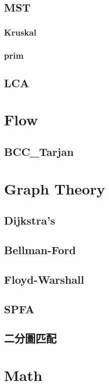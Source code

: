 	\subsection{MST}
        \subsubsection{Kruskal}
            
        \subsubsection{prim}
            
	\subsection{LCA}
		
\section{Flow}
	\subsection{BCC\_Tarjan}
		
\section{Graph Theory}
	\subsection{Dijkstra’s}
		
	\subsection{Bellman-Ford}
		
	\subsection{Floyd-Warshall}
		
	\subsection{SPFA}
		
	\subsection{二分圖匹配}
		
\section{Math}
